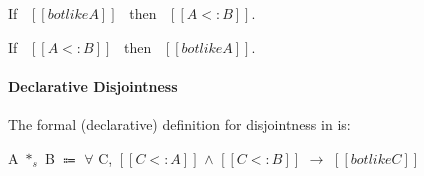 \begin{lemma}
  If \ $[[botlike A]]$ \ then \ $[[A <: B]]$.
\label{lemma:union:bl-soundness}
\end{lemma}

\begin{comment}
\begin{proof}
  By induction on bottom-like relation.
  \begin{itemize}
    \item All cases are trivial to prove.
  \end{itemize}
\end{proof}
\end{comment}

\begin{lemma}
  If \ $[[A <: B]]$ \ then \ $[[botlike A]]$.
\label{lemma:union:bl-completeness}
\end{lemma}

\begin{comment}
\begin{proof}
  By induction on type $[[A]]$.
  \begin{itemize}
    \item Cases $[[Top]]$, $[[Bot]]$, $[[Int]]$ and $[[A -> B]]$ are trivial to prove.
    \item Case $[[A \/ B]]$ requires \Cref{lemma:union:sub-or}.
  \end{itemize}
\end{proof}
\end{comment}

\paragraph{Declarative Disjointness}
The formal (declarative) definition for disjointness in \name is:

\begin{definition}
  A $*_s$ B $\Coloneqq$ $\forall$ C, $[[C <: A]]$ $\wedge$ $[[C <: B]]$ $\rightarrow$ $[[botlike C]]$
\label{def:union:disj}
\end{definition}

